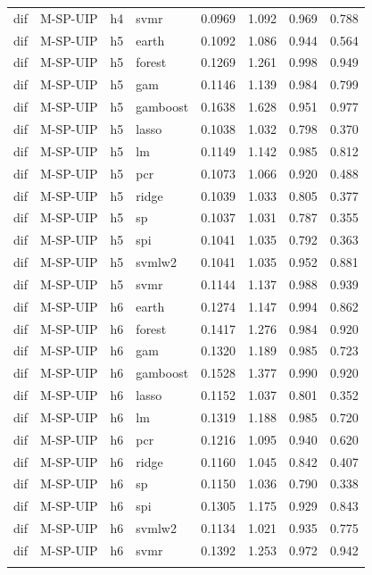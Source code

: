 \begin{ThreePartTable}
\begin{longtable}[t]{llclcccc}
dif & M-SP-UIP & h4 & svmr & 0.0969 & 1.092 & 0.969 & 0.788\\
\addlinespace
dif & M-SP-UIP & h5 & earth & 0.1092 & 1.086 & 0.944 & 0.564\\
dif & M-SP-UIP & h5 & forest & 0.1269 & 1.261 & 0.998 & 0.949\\
dif & M-SP-UIP & h5 & gam & 0.1146 & 1.139 & 0.984 & 0.799\\
dif & M-SP-UIP & h5 & gamboost & 0.1638 & 1.628 & 0.951 & 0.977\\
dif & M-SP-UIP & h5 & lasso & 0.1038 & 1.032 & 0.798 & 0.370\\
dif & M-SP-UIP & h5 & lm & 0.1149 & 1.142 & 0.985 & 0.812\\
dif & M-SP-UIP & h5 & pcr & 0.1073 & 1.066 & 0.920 & 0.488\\
dif & M-SP-UIP & h5 & ridge & 0.1039 & 1.033 & 0.805 & 0.377\\
dif & M-SP-UIP & h5 & sp & 0.1037 & 1.031 & 0.787 & 0.355\\
dif & M-SP-UIP & h5 & spi & 0.1041 & 1.035 & 0.792 & 0.363\\
dif & M-SP-UIP & h5 & svmlw2 & 0.1041 & 1.035 & 0.952 & 0.881\\
dif & M-SP-UIP & h5 & svmr & 0.1144 & 1.137 & 0.988 & 0.939\\
\addlinespace
dif & M-SP-UIP & h6 & earth & 0.1274 & 1.147 & 0.994 & 0.862\\
dif & M-SP-UIP & h6 & forest & 0.1417 & 1.276 & 0.984 & 0.920\\
dif & M-SP-UIP & h6 & gam & 0.1320 & 1.189 & 0.985 & 0.723\\
dif & M-SP-UIP & h6 & gamboost & 0.1528 & 1.377 & 0.990 & 0.920\\
dif & M-SP-UIP & h6 & lasso & 0.1152 & 1.037 & 0.801 & 0.352\\
dif & M-SP-UIP & h6 & lm & 0.1319 & 1.188 & 0.985 & 0.720\\
dif & M-SP-UIP & h6 & pcr & 0.1216 & 1.095 & 0.940 & 0.620\\
dif & M-SP-UIP & h6 & ridge & 0.1160 & 1.045 & 0.842 & 0.407\\
dif & M-SP-UIP & h6 & sp & 0.1150 & 1.036 & 0.790 & 0.338\\
dif & M-SP-UIP & h6 & spi & 0.1305 & 1.175 & 0.929 & 0.843\\
dif & M-SP-UIP & h6 & svmlw2 & 0.1134 & 1.021 & 0.935 & 0.775\\
dif & M-SP-UIP & h6 & svmr & 0.1392 & 1.253 & 0.972 & 0.942\\
\addlinespace

\end{longtable}
\end{ThreePartTable}
